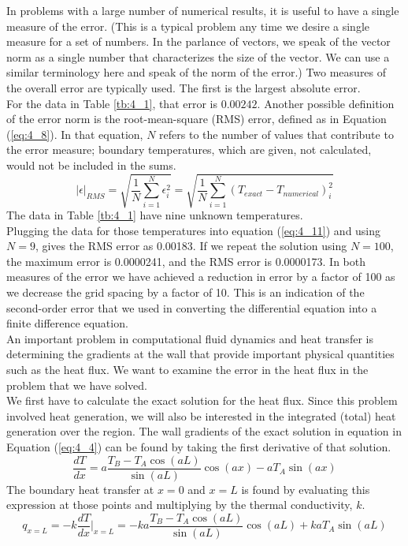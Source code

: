 \documentclass[12pt]{report}
\newcommand{\refn}[1]{(\ref{#1})}
\newcommand{\refx}[1]{\refn{eq:#1}}
\newcommand{\NI}{\noindent}
\begin{document}
	\NI In problems with a large number of numerical results, it is useful to have a single measure of the error. (This is a typical problem any time we desire a single measure for a set of numbers. In the parlance of vectors, we speak of the vector norm as a single number that characterizes the size of the vector. We can use a similar terminology here and speak of the norm of the error.) Two measures of the overall error are typically used. The first is the largest absolute error.\\
	
	\NI For the data in Table \ref{tb:4_1}, that error is $0.00242$. Another possible definition of the error norm is the root-mean-square (RMS) error, defined as in Equation \refx{4_8}. In that equation, $N$ refers to the number of values that contribute to the error measure; boundary temperatures, which are given, not calculated, would not be included in the sums.
	\begin{equation}
		\Big|\epsilon\Big|_{RMS} = \sqrt{\frac{1}{N}\sum_{i=1}^{N}\epsilon_i^2} = \sqrt{\frac{1}{N}\sum_{i=1}^{N}(T_{exact}-T_{numerical})_i^2} \label{eq:4_8}
	\end{equation}
	The data in Table \ref{tb:4_1} have nine unknown temperatures.\\
	
	\NI Plugging the data for those temperatures into equation \refx{4_11} and using $N = 9$, gives the RMS error as 0.00183. If we repeat the solution using $N = 100$, the maximum error is 0.0000241, and the RMS error is 0.0000173. In both measures of the error we have achieved a reduction
	in error by a factor of 100 as we decrease the grid spacing by a factor of 10. This is an indication of the second-order error that we used in converting the differential equation into a finite difference equation.\\
	
	\NI An important problem in computational fluid dynamics and heat transfer is determining the gradients at the wall that provide important physical quantities such as the heat flux. We want to examine the error in the heat flux in the problem that we have solved.\\
	
	\NI We first have to calculate the exact solution for the heat flux. Since this problem involved heat generation, we will also be interested in the integrated (total) heat generation over the region. The wall gradients of the exact solution in equation in Equation \refx{4_4} can be found by taking
	the first derivative of that solution.
	\begin{equation}
		\frac{dT}{dx}=a\frac{T_B-T_A\cos(aL)}{\sin(aL)}\cos(ax) - aT_A\sin(ax)\label{eq:4_9}
	\end{equation}
	The boundary heat transfer at $x = 0$ and $x = L$ is found by evaluating this expression at those points and multiplying by the thermal conductivity, $k$.
	\begin{equation}
		q_{x=L} = -k\frac{dT}{dx}\Big|_{x=L} = -ka\frac{T_B - T_A\cos(aL)}{\sin(aL)}\cos(aL) + kaT_A\sin(aL) \label{eq:4_10}
	\end{equation}
	
\end{document}
